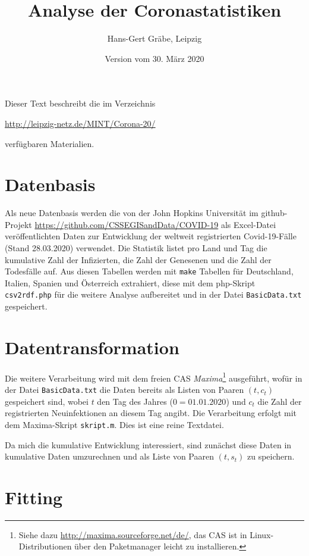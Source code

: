 \documentclass[a4paper,11pt]{article}
\title{Analyse der Coronastatistiken}
\author{Hans-Gert Gräbe, Leipzig}
\date{Version vom 30. März 2020}
\begin{document}
\maketitle

Dieser Text beschreibt die im Verzeichnis
\begin{center}
  \url{http://leipzig-netz.de/MINT/Corona-20/}
\end{center}
verfügbaren Materialien. 

\section{Datenbasis}

Als neue Datenbasis werden die von der John Hopkins Universität im
github-Projekt \url{https://github.com/CSSEGISandData/COVID-19} als
Excel-Datei veröffentlichten Daten zur Entwicklung der weltweit registrierten
Covid-19-Fälle (Stand 28.03.2020) verwendet. Die Statistik listet pro Land und
Tag die kumulative Zahl der Infizierten, die Zahl der Genesenen und die Zahl
der Todesfälle auf.  Aus diesen Tabellen werden mit \texttt{make} Tabellen für
Deutschland, Italien, Spanien und Österreich extrahiert, diese mit dem
php-Skript \texttt{csv2rdf.php} für die weitere Analyse aufbereitet und in der
Datei \texttt{BasicData.txt} gespeichert.

\section{Datentransformation}

Die weitere Verarbeitung wird mit dem freien CAS \emph{Maxima}\footnote{Siehe
  dazu \url{http://maxima.sourceforge.net/de/}, das CAS ist in
  Linux-Distributionen über den Paketmanager leicht zu installieren.}
ausgeführt, wofür in der Datei \texttt{BasicData.txt} die Daten bereits als
Listen von Paaren $(t,c_t)$ gespeichert sind, wobei $t$ den Tag des Jahres
($0=01.01.2020$) und $c_t$ die Zahl der registrierten Neuinfektionen an diesem
Tag angibt. Die Verarbeitung erfolgt mit dem Maxima-Skript \texttt{skript.m}.
Dies ist eine reine Textdatei.

Da mich die kumulative Entwicklung interessiert, sind zunächst diese Daten in
kumulative Daten umzurechnen und als Liste von Paaren $(t,s_t)$ zu speichern.

\section{Fitting}
\end{document}

